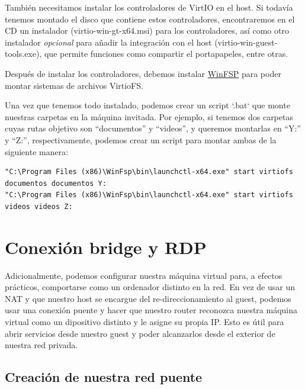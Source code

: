 \documentclass[11pt]{article}
\begin{document}
\vspace{5pt}

También necesitamos instalar los controladores de VirtIO en el host. Si todavía tenemos montado el disco que contiene estos controladores, encontraremos en el CD un instalador (virtio-win-gt-x64.msi) para los controladores, así como otro instalador \emph{opcional} para añadir la integración con el host (virtio-win-guest-tools.exe), que permite funciones como compartir el portapapeles, entre otras.

\vspace{5pt}

Después de instalar los controladores, debemos instalar \href{https://github.com/winfsp/winfsp}{WinFSP} para poder montar sistemas de archivos VirtioFS.

\vspace{5pt}

Una vez que tenemos todo instalado, podemos crear un script `.bat` que monte nuestras carpetas en la máquina invitada. Por ejemplo, si tenemos dos carpetas cuyas rutas objetivo son ``documentos'' y ``videos'', y queremos montarlas en ``Y:'' y ``Z:'', respectivamente, podemos crear un script para montar ambas de la siguiente manera:

\vspace{5pt}

\begin{lstlisting}[basicstyle=\scriptsize\ttfamily]
"C:\Program Files (x86)\WinFsp\bin\launchctl-x64.exe" start virtiofs documentos documentos Y:
"C:\Program Files (x86)\WinFsp\bin\launchctl-x64.exe" start virtiofs videos videos Z:
\end{lstlisting}

\section{Conexión bridge y RDP}

Adicionalmente, podemos configurar nuestra máquina virtual para, a efectos prácticos, comportarse como un ordenador distinto en la red. En vez de usar un NAT y que nuestro host se encargue del re-direccionamiento al guest, podemos usar una conexión puente y hacer que nuestro router reconozca nuestra máquina virtual como un dipositivo distinto y le asigne su propia IP. Esto es útil para abrir servicios desde nuestro guest y poder alcanzarlos desde el exterior de nuestra red privada.

\subsection{Creación de nuestra red puente}
\end{document}

